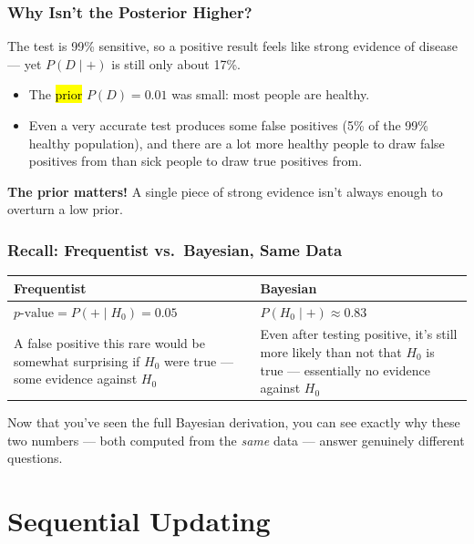\documentclass[slidestop,compress,mathserif]{beamer}
\begin{document}
\begin{frame}
    \frametitle{Why Isn't the Posterior Higher?}
    The test is 99\% sensitive, so a positive result feels like strong evidence of disease --- yet $P(D\mid +)$ is still only about 17\%.
    \pause

    \medskip
    \begin{itemize}
        \item The \hl{prior} $P(D) = 0.01$ was small: most people are healthy.
        \item Even a very accurate test produces some false positives (5\% of the 99\% healthy population), and there are a lot more healthy people to draw false positives from than sick people to draw true positives from.
    \end{itemize}
    \pause

    \medskip
    \textbf{The prior matters!} A single piece of strong evidence isn't always enough to overturn a low prior.
\end{frame}

\begin{frame}
    \frametitle{Recall: Frequentist vs.\ Bayesian, Same Data}
    \begin{center}
    \renewcommand{\arraystretch}{1.3}
    \begin{tabular}{>{\raggedright\arraybackslash}p{4.7cm} >{\raggedright\arraybackslash}p{4.7cm}}
    \toprule
    \textbf{Frequentist} & \textbf{Bayesian} \\
    \midrule
    $p\text{-value} = P(+\mid H_0) = 0.05$ & $P(H_0\mid +) \approx 0.83$ \\
    A false positive this rare would be somewhat surprising if $H_0$ were true --- some evidence against $H_0$ & Even after testing positive, it's still more likely than not that $H_0$ is true --- essentially no evidence against $H_0$ \\
    \bottomrule
    \end{tabular}
    \end{center}
    \pause

    \medskip
    Now that you've seen the full Bayesian derivation, you can see exactly why these two numbers --- both computed from the \emph{same} data --- answer genuinely different questions.
\end{frame}


\section{Sequential Updating}
\end{document}
